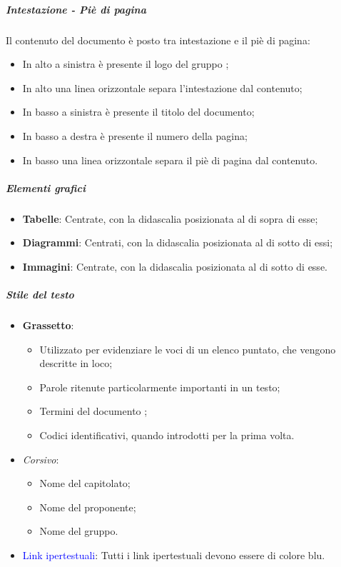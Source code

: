 \subparagraph*{Intestazione - Piè di pagina}
Il contenuto del documento è posto tra intestazione e il piè di pagina:

\begin{itemize}
\item In alto a sinistra è presente il logo del gruppo \Gruppo{};
\item In alto una linea orizzontale separa l’intestazione dal contenuto;
\item In basso a sinistra è presente il titolo del documento;
\item In basso a destra è presente il numero della pagina;
\item In basso una linea orizzontale separa il piè di pagina dal contenuto.
\end{itemize}

\subparagraph*{Elementi grafici}
\begin{itemize}
\item \textbf{Tabelle}: Centrate, con la didascalia posizionata al di sopra di esse;
\item \textbf{Diagrammi}: Centrati, con la didascalia posizionata al di sotto di essi;
\item \textbf{Immagini}: Centrate, con la didascalia posizionata al di sotto di esse.
\end{itemize}

\subparagraph*{Stile del testo}
\begin{itemize}
    \item \textbf{Grassetto}:
    \begin{itemize}
        \item Utilizzato per evidenziare le voci di un elenco puntato, che vengono descritte in loco;
        \item Parole ritenute particolarmente importanti in un testo;
        \item Termini del documento \Glossario{};
        \item Codici identificativi, quando introdotti per la prima volta.
    \end{itemize}
    \item \textit{Corsivo}:
    \begin{itemize}
        \item Nome del capitolato;
        \item Nome del proponente;
        \item Nome del gruppo.
    \end{itemize}
    \item \textcolor{blue}{Link ipertestuali}: Tutti i link ipertestuali devono essere di colore blu.
\end{itemize}

